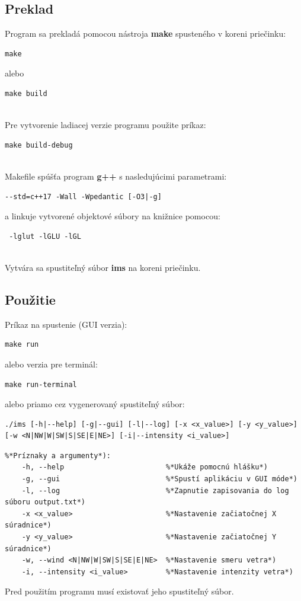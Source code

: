 \documentclass[a4paper,12pt]{article}
\begin{document}
\subsection{Preklad}
Program sa prekladá pomocou nástroja {\bf make} spusteného v koreni priečinku:
\begin{lstlisting}
make
\end{lstlisting}
alebo
\begin{lstlisting}
make build
\end{lstlisting}
\leavevmode\\
Pre vytvorenie ladiacej verzie programu použite príkaz:
\begin{lstlisting}
make build-debug
\end{lstlisting}
\leavevmode\\
Makefile spúšťa program \textbf{g++} s nasledujúcimi parametrami:
\begin{lstlisting}
--std=c++17 -Wall -Wpedantic [-O3|-g]
\end{lstlisting}
a linkuje vytvorené objektové súbory na knižnice pomocou:
\begin{lstlisting}
 -lglut -lGLU -lGL
\end{lstlisting}
\leavevmode\\
Vytvára sa spustiteľný súbor {\bf ims} na koreni priečinku.

\subsection{Použitie}
Príkaz na spustenie (GUI verzia):
\begin{lstlisting}
make run
\end{lstlisting}
alebo verzia pre terminál:
\begin{lstlisting}
make run-terminal
\end{lstlisting}
alebo priamo cez vygenerovaný spustiteľný súbor:
\begin{lstlisting}
./ims [-h|--help] [-g|--gui] [-l|--log] [-x <x_value>] [-y <y_value>] [-w <N|NW|W|SW|S|SE|E|NE>] [-i|--intensity <i_value>]
\end{lstlisting}
\begin{lstlisting}
%*Príznaky a argumenty*):
    -h, --help                        %*Ukáže pomocnú hlášku*)
    -g, --gui                         %*Spustí aplikáciu v GUI móde*)
    -l, --log                         %*Zapnutie zapisovania do log súboru output.txt*)
    -x <x_value>                      %*Nastavenie začiatočnej X súradnice*)
    -y <y_value>                      %*Nastavenie začiatočnej Y súradnice*)
    -w, --wind <N|NW|W|SW|S|SE|E|NE>  %*Nastavenie smeru vetra*)
    -i, --intensity <i_value>         %*Nastavenie intenzity vetra*)
\end{lstlisting}
Pred použitím programu musí existovať jeho spustiteľný súbor.
\end{document}
